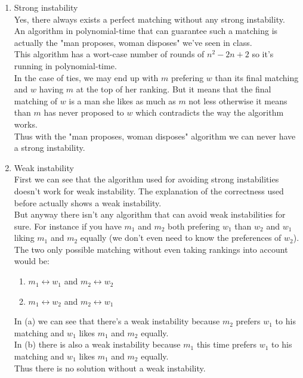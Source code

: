 \begin{enumerate}
	\item Strong instability\\
	Yes, there always exists a perfect matching without any strong instability.\\
	An algorithm in polynomial-time that can guarantee such a matching is actually the "man proposes, woman disposes" we've seen in class.\\
	This algorithm has a wort-case number of rounds of $n^2 - 2n + 2$ so it's running in polynomial-time.\\
	In the case of ties, we may end up with $m$ prefering $w$ than its final matching and $w$ having $m$ at the top of her ranking. But it means that the final matching of $w$ is a man she likes as much as $m$ not less otherwise it means than $m$ has never proposed to $w$ which contradicts the way the algorithm works.\\
	Thus with the "man proposes, woman disposes" algorithm we can never have a strong instability.
	\item Weak instability\\
	First we can see that the algorithm used for avoiding strong instabilities doesn't work for weak instability. The explanation of the correctness used before actually shows a weak instability.\\
	But anyway there isn't any algorithm that can avoid weak instabilities for sure. For instance if you have $m_1$ and $m_2$ both prefering $w_1$ than $w_2$ and $w_1$ liking $m_1$ and $m_2$ equally (we don't even need to know the preferences of $w_2$). The two only possible matching without even taking rankings into account would be:
	\begin{enumerate}
		\item $m_1 \longleftrightarrow w_1$ and $m_2 \longleftrightarrow w_2$
		\item $m_1 \longleftrightarrow w_2$ and $m_2 \longleftrightarrow w_1$ 
	\end{enumerate}
	In (a) we can see that there's a weak instability because $m_2$ prefers $w_1$ to his matching and $w_1$ likes $m_1$ and $m_2$ equally.\\
	In (b) there is also a weak instability because $m_1$ this time prefers $w_1$ to his matching and $w_1$ likes $m_1$ and $m_2$ equally.\\
	Thus there is no solution without a weak instability.
\end{enumerate}